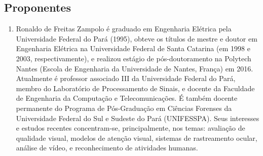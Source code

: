 \subsection{Proponentes}
\label{ssec:equipe}
\begin{enumerate}
	\item Ronaldo de Freitas Zampolo é graduado em Engenharia Elétrica pela Universidade Federal do Pará (1995), obteve os títulos de mestre e doutor em Engenharia Elétrica na Universidade Federal de Santa Catarina (em 1998 e 2003, respectivamente), e realizou estágio de pós-doutoramento na Polytech Nantes (Escola de Engenharia da Universidade de Nantes, França) em 2016. Atualmente é professor associado III da Universidade Federal do Pará, membro do Laboratório de Processamento de Sinais, e docente da Faculdade de Engenharia da Computação e Telecomunicações. É também docente permanente do Programa de Pós-Graduação em Ciências Forenses da Universidade Federal do Sul e Sudeste do Pará (UNIFESSPA). Seus interesses e estudos recentes concentram-se, principalmente, nos temas: avaliação de qualidade visual, modelos de atenção visual, sistemas de rastreamento ocular, análise de vídeo, e reconhecimento de atividades humanas. 


\end{enumerate}
